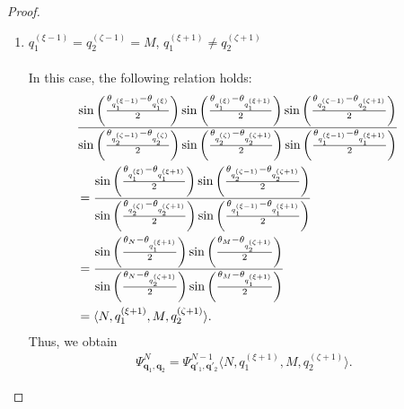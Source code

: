 \documentclass[
amsmath,amssymb,
]{revtex4-2}
\begin{document}
\begin{proof}
\begin{enumerate}
\item[\textit{Case.2:}] $q_1^{(\xi-1)} = q_2^{(\zeta-1)} = M$, ${q_1^{(\xi+1)}} \ne {q_2^{(\zeta+1)}}$ \\ \\
In this case, the following relation holds:
%
\begin{align}
    &\frac{\sin\left( \frac{\theta_{q_1^{(\xi-1)}} - \theta_{q_1^{(\xi)}}}{2} \right)\sin\left( \frac{\theta_{q_1^{(\xi)}} - \theta_{q_1^{(\xi+1)}}}{2} \right)\sin\left( \frac{\theta_{q_2^{(\zeta-1)}} - \theta_{q_2^{(\zeta+1)}}}{2} \right)}
   {\sin\left( \frac{\theta_{q_2^{(\zeta-1)}} - \theta_{q_2^{(\zeta)}}}{2} \right)\sin\left( \frac{\theta_{q_2^{(\zeta)}} - \theta_{q_2^{(\zeta+1)}}}{2} \right)\sin\left( \frac{\theta_{q_1^{(\xi-1)}} - \theta_{q_1^{(\xi+1)}}}{2} \right)}\cr
    &=\frac{\sin\left( \frac{\theta_{q_1^{(\xi)}} - \theta_{q_1^{(\xi+1)}}}{2} \right)\sin\left( \frac{\theta_{q_2^{(\zeta-1)}} - \theta_{q_2^{(\zeta+1)}}}{2} \right)}
   {\sin\left( \frac{\theta_{q_2^{(\zeta)}} - \theta_{q_2^{(\zeta+1)}}}{2} \right)\sin\left( \frac{\theta_{q_1^{(\xi-1)}} - \theta_{q_1^{(\xi+1)}}}{2} \right)}\cr
   &=\frac{\sin\left( \frac{\theta_{N} - \theta_{q_1^{(\xi+1)}}}{2} \right)\sin\left( \frac{\theta_{M} - \theta_{q_2^{(\zeta+1)}}}{2} \right)}
   {\sin\left( \frac{\theta_{N} - \theta_{q_2^{(\zeta+1)}}}{2} \right)\sin\left( \frac{\theta_{M} - \theta_{q_1^{(\xi+1)}}}{2} \right)}\cr
   &= \langle N,q_1^{(\xi+1)},M, q_2^{(\zeta+1)}\rangle.
\end{align}
Thus, we obtain
\begin{align}
    \Psi^N_{\bm{q}_1, \bm{q}_2} = \Psi^{N-1}_{\bm{q}'_1, \bm{q}'_2}\langle N,q_1^{(\xi+1)},M, q_2^{(\zeta+1)}\rangle.
\end{align}


\end{enumerate}
\end{proof}
\end{document}
